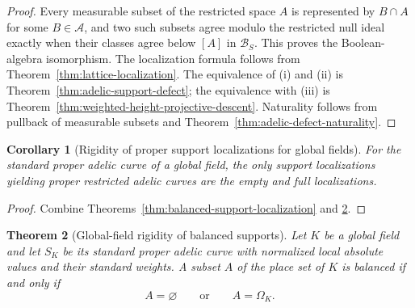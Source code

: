 \documentclass[11pt]{amsart}
\numberwithin{equation}{section}
\newtheorem{theorem}{Theorem}[section]
\newtheorem{corollary}[theorem]{Corollary}
\theoremstyle{definition}
\begin{document}
\begin{proof}
Every measurable subset of the restricted space $A$ is represented by
$B\cap A$ for some $B\in\mathcal A$, and two such subsets agree modulo the
restricted null ideal exactly when their classes agree below $[A]$ in
$\mathscr B_S$.  This proves the Boolean-algebra isomorphism.  The
localization formula follows from
Theorem~\ref{thm:lattice-localization}.  The equivalence of (i) and (ii) is
Theorem~\ref{thm:adelic-support-defect}; the equivalence with (iii) is
Theorem~\ref{thm:weighted-height-projective-descent}.  Naturality follows
from pullback of measurable subsets and
Theorem~\ref{thm:adelic-defect-naturality}.
\end{proof}

\begin{corollary}[Rigidity of proper support localizations for global fields]
\label{cor:global-balanced-localization-rigidity}
For the standard proper adelic curve of a global field, the only support
localizations yielding proper restricted adelic curves are the empty and
full localizations.
\end{corollary}

\begin{proof}
Combine Theorems~\ref{thm:balanced-support-localization} and
\ref{thm:global-field-balanced-supports}.
\end{proof}

\begin{theorem}[Global-field rigidity of balanced supports]
\label{thm:global-field-balanced-supports}
Let $K$ be a global field and let $S_K$ be its standard proper adelic
curve with normalized local absolute values and their standard weights.
A subset $A$ of the place set of $K$ is balanced if and only if
\[
A=\varnothing
\qquad\text{or}\qquad
A=\Omega_K.
\]
\end{theorem}
\end{document}
